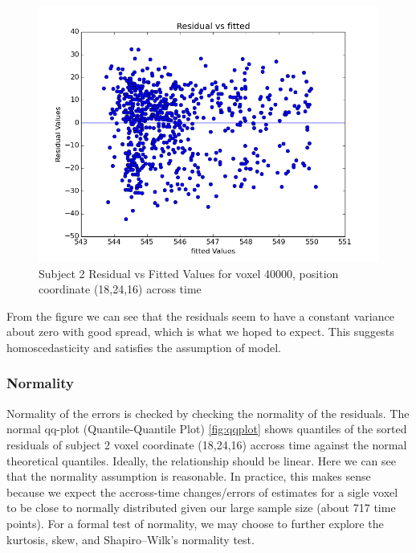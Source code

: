 \begin{figure}[ht]
\centering
\includegraphics[scale=0.5]{figures/res_fitted}  
\caption{Subject 2 Residual vs Fitted Values for voxel 40000, position 
coordinate (18,24,16) across time}
\label{fig:residual_vs_fitted}
\end{figure}

From the figure we can see that the residuals seem to have a constant variance
about zero with good spread, which is what we hoped to expect. This suggests 
homoscedasticity and satisfies the assumption of model. 

\subsubsection{Normality}
Normality of the errors is checked by checking the normality of the residuals. 
The normal qq-plot (Quantile-Quantile Plot) \ref{fig:qqplot} shows quantiles
of the sorted residuals of subject 2 voxel coordinate (18,24,16) accross time
against the normal theoretical quantiles. Ideally, the relationship should be 
linear. Here we can see that the normality assumption is reasonable. In 
practice, this makes sense because we expect the accross-time changes/errors 
of estimates for a sigle voxel to be close to normally distributed given our 
large sample size (about 717 time points). For a formal test of normality, we 
may choose to further explore the kurtosis, skew, and Shapiro–Wilk's normality
test. 

